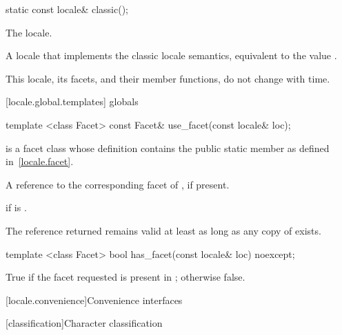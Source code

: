 %
%
\begin{itemdecl}
static const locale& classic();
\end{itemdecl}

\begin{itemdescr}
\pnum
The  locale.

\pnum
\returns
A locale that implements the classic  locale semantics, equivalent
to the value .

\pnum
\remarks
This locale, its facets, and their member functions, do not change
with time.
\end{itemdescr}

[locale.global.templates]{ globals}

%
%
\begin{itemdecl}
template <class Facet> const Facet& use_facet(const locale& loc);
\end{itemdecl}

\begin{itemdescr}
\pnum
\requires
{}
is a facet class whose definition contains the public static member
as defined in~\ref{locale.facet}.

\pnum
\returns
A reference to the corresponding facet of , if present.

\pnum
\throws
{}
if
is
.

\pnum
\remarks
The reference returned remains valid at least as long as any copy of
 exists.
\end{itemdescr}

%
%
\begin{itemdecl}
template <class Facet> bool has_facet(const locale& loc) noexcept;
\end{itemdecl}

\begin{itemdescr}
\pnum
\returns
True if the facet requested is present in ; otherwise false.
\end{itemdescr}

[locale.convenience]{Convenience interfaces}

[classification]{Character classification}

